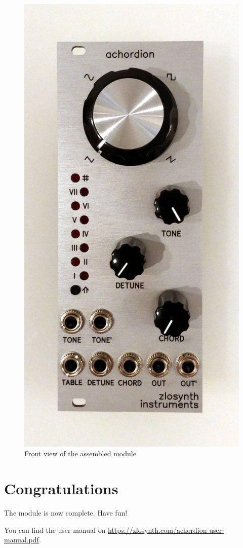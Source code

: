 \documentclass[10pt,a4paper,twocolumn]{article}
\begin{document}
\begin{figure}[p]
  \centering
  \includegraphics[width=\linewidth]{p08.jpg}
  \caption{Front view of the assembled module}
\end{figure}

\section{Congratulations}

The module is now complete. Have fun!

You can find the user manual on \url{https://zlosynth.com/achordion-user-manual.pdf}.
\end{document}
